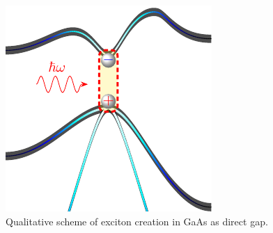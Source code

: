 \begin{figure}[H]
	\centering
	\includegraphics[width=0.5\linewidth]{../figures/chapter-1/exciton-1/build/x-1}
	\caption{Qualitative scheme of exciton creation in GaAs as direct gap.}
	\label{fig:subsubsection-1.1.1-x-1}
\end{figure}

